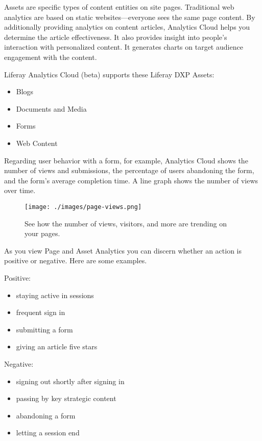 Assets are specific types of content entities on site pages. Traditional
web analytics are based on static websites---everyone sees the same page
content. By additionally providing analytics on content articles,
Analytics Cloud helps you determine the article effectiveness. It also
provides insight into people's interaction with personalized content. It
generates charts on target audience engagement with the content.

Liferay Analytics Cloud (beta) supports these Liferay DXP Assets:

\begin{itemize}
\tightlist
\item
  Blogs
\item
  Documents and Media
\item
  Forms
\item
  Web Content
\end{itemize}

Regarding user behavior with a form, for example, Analytics Cloud shows
the number of views and submissions, the percentage of users abandoning
the form, and the form's average completion time. A line graph shows the
number of views over time.

\begin{figure}
\centering
\texttt{[image: ./images/page-views.png]}
\caption{See how the number of views, visitors, and more are trending on
your pages.}
\end{figure}

As you view Page and Asset Analytics you can discern whether an action
is positive or negative. Here are some examples.

Positive:

\begin{itemize}
\tightlist
\item
  staying active in sessions
\item
  frequent sign in
\item
  submitting a form
\item
  giving an article five stars
\end{itemize}

Negative:

\begin{itemize}
\tightlist
\item
  signing out shortly after signing in
\item
  passing by key strategic content
\item
  abandoning a form
\item
  letting a session end
\end{itemize}

